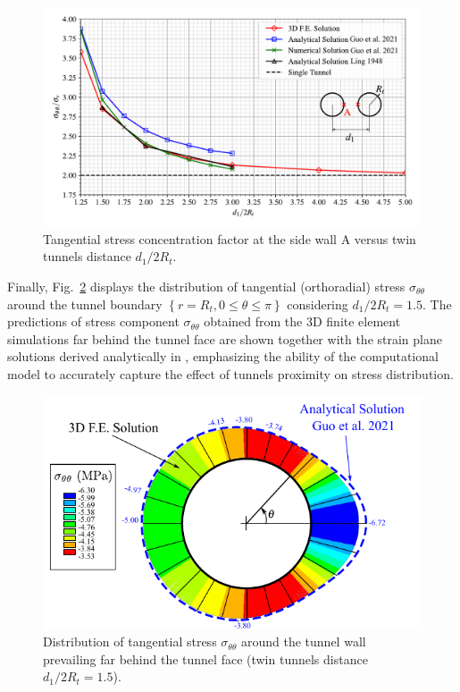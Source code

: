 \documentclass[Journal,letterpaper, NoLists,SectionNumbers]{ascelike-new}
\begin{document}
\begin{figure}[h!]
	\centering
	\includegraphics[scale=0.65]{Tangencial stress concentration factor in A.pdf}
	\caption{Tangential stress concentration factor at the side wall A versus twin tunnels distance $d_1/2R_t$.}
	\label{Tangencial stress concentration factor in A}
\end{figure}

Finally, Fig.~\ref{GUO_FIG1} displays the distribution of tangential (orthoradial) stress $\sigma_{\theta \theta}$ around the tunnel boundary $\left\{r = R_t, 0 \le \theta \le \pi\right\}$ considering $d_1/2R_t = 1.5$. The predictions of stress component $\sigma_{\theta \theta}$ obtained from the 3D finite element simulations far behind the tunnel face are shown together with the strain plane solutions derived analytically in , emphasizing the ability of the computational model to accurately capture the effect of tunnels proximity on stress distribution.

\begin{figure}[h!]
	\centering
	\includegraphics[scale=1]{GUO_FIG1.pdf}
	\caption{Distribution of tangential stress $\sigma_{\theta \theta}$ around the tunnel wall  prevailing far behind the tunnel face (twin tunnels distance $d_1/2R_t = 1.5$).}
	\label{GUO_FIG1}
\end{figure}
\end{document}
